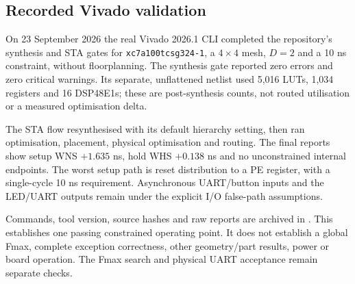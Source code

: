 \subsection{Recorded Vivado validation}
\label{sec:vivado-validation}

On 23 September 2026 the real Vivado 2026.1 CLI completed the repository's
synthesis and STA gates for \texttt{xc7a100tcsg324-1}, a $4\times4$ mesh,
$D=2$ and a 10 ns constraint, without floorplanning. The synthesis gate
reported zero errors and zero critical warnings. Its separate, unflattened
netlist used 5,016 LUTs, 1,034 registers and 16 DSP48E1s; these are post-synthesis
counts, not routed utilisation or a measured optimisation delta.

The STA flow resynthesised with its default hierarchy setting, then ran
optimisation, placement, physical optimisation and routing. The final reports
show setup WNS $+1.635$ ns, hold WHS $+0.138$ ns and no unconstrained internal
endpoints. The worst setup path is reset distribution to a PE register, with
a single-cycle 10 ns requirement. Asynchronous UART/button inputs and the
LED/UART outputs remain under the explicit I/O false-path assumptions.

Commands, tool version, source hashes and raw reports are archived in
. This establishes one passing
constrained operating point. It does not establish a global Fmax, complete
exception correctness, other geometry/part results, power or board operation.
The Fmax search and physical UART acceptance remain separate checks.
